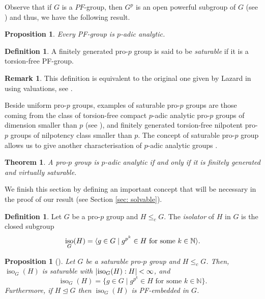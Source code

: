 \documentclass[11pt]{article}
\newcommand{\N}{\mathbb{N}}
\newcommand{\normaleq}{\unlhd}
\DeclareMathOperator{\iso}{iso}
\newcommand{\leqc}{\leq_c}
\DeclarePairedDelimiter{\abs}{\lvert}{\rvert}
\DeclarePairedDelimiter{\gen}{\langle}{\rangle}
\theoremstyle{plain}
\newtheorem{proposition}[lemma]{Proposition}
\newtheorem{theorem}[lemma]{Theorem}
\theoremstyle{definition}
\newtheorem{definition}[lemma]{Definition}
\newtheorem{remark}[lemma]{Remark}
\begin{document}
	Observe that if $G$ is a $PF$-group, then $G^p$ is an open powerful subgroup of $G$ (see \cite[Proposition 3.2, Corollary 3.5]{FGJ}) and thus, we have the following result. 
	\begin{proposition}
		Every PF-group is $p$-adic analytic.
	\end{proposition}
	
	
	\begin{definition}
		A finitely generated pro-$p$ group is said to be \emph{saturable} if it is a torsion-free PF-group.
	\end{definition}
	
		\begin{remark}
		This definition is equivalent to the original one given by Lazard in \cite{lazard65} using valuations, see \cite[Theorem 3.4]{gonzalez07}.
	\end{remark}
	
	Beside uniform pro-$p$ groups, examples of saturable pro-$p$ groups are those coming from the class of torsion-free compact $p$-adic analytic pro-$p$ groups of dimension smaller than $p$ (see \cite{gonzalezklopsch09}), and finitely generated torsion-free nilpotent pro-$p$ groups of nilpotency class smaller than $p$. The concept of saturable pro-$p$ group allows us to give another characterisation of $p$-adic analytic groups \cite{lazard65}.
	



\begin{theorem}
	A pro-$p$ group is $p$-adic analytic if and only if it is finitely generated and virtually saturable. 
\end{theorem}
	
	We finish this section by defining an important concept that will be necessary in the proof of our result (see Section \ref{sec: solvable}).
	
	\begin{definition}
		Let $G$ be a pro-$p$ group and $H\leqc G$. The \emph{isolator} of $H$ in $G$ is the closed subgroup
		\begin{displaymath}
			\iso_G(H)=\gen{g\in G\mid g^{p^k}\in H \text{ for some } k\in \N}.
		\end{displaymath}
	\end{definition}
	
	\begin{proposition}[{\cite[Proposition 3.21]{gonzalezklopsch09}}]\label{prop: isolator}
		Let $G$ be a saturable pro-$p$ group and $H\leqc G$. Then, $\iso_G(H)$ is saturable with  $\abs{\iso_G(H):H}<\infty$, and 
		\begin{displaymath}
			\iso_G(H)=\{g\in G\mid g^{p^k}\in H \text{ for some } k\in \N\}.
		\end{displaymath}
	Furthermore, if $H\normaleq G$ then $\iso_G(H)$ is PF-embedded in $G$. 
	\end{proposition}
\end{document}

